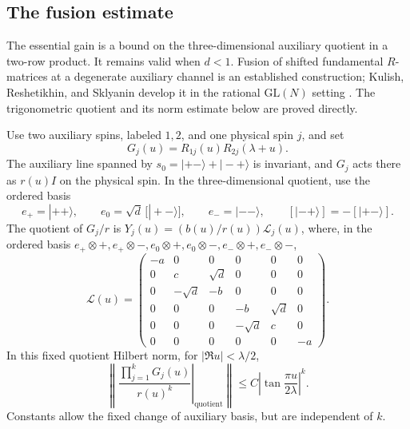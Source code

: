 \subsection{The fusion estimate}

The essential gain is a bound on the three-dimensional auxiliary
quotient in a two-row product.  It remains valid when $d<1$.
Fusion of shifted fundamental $R$-matrices at a degenerate auxiliary
channel is an established construction; Kulish, Reshetikhin, and
Sklyanin develop it in the rational $\mathrm{GL}(N)$ setting
\cite[Section~2, equations~(12)--(18)]{KulishReshetikhinSklyanin1981}.
The trigonometric quotient and its norm estimate below are proved directly.

\begin{lemma}\label{angular:fusion}
Use two auxiliary spins, labeled $1,2$, and one physical spin $j$,
and set
\begin{equation}\label{angular:G}
 G_j(u)=R_{1j}(u)R_{2j}(\lambda+u).
\end{equation}
The auxiliary line spanned by
$s_0=|+-\rangle+|-+\rangle$ is invariant, and $G_j$ acts there
as $r(u)I$ on the physical spin.  In the three-dimensional quotient,
use the ordered basis
\[
 e_+=|++\rangle,\qquad e_0=\sqrt d\,[|+-\rangle],\qquad
 e_-=|--\rangle,
 \qquad [|-+\rangle]=-[|+-\rangle].
\]
The quotient of $G_j/r$ is
$Y_j(u)=(b(u)/r(u))\mathcal L_j(u)$, where, in the ordered basis
$e_+\otimes+,e_+\otimes-,e_0\otimes+,e_0\otimes-,
e_-\otimes+,e_-\otimes-$,
\begin{equation}\label{angular:fused-blocks}
 \mathcal L(u)=
 \begin{pmatrix}
 -a&0&0&0&0&0\\
 0&c&\sqrt d&0&0&0\\
 0&-\sqrt d&-b&0&0&0\\
 0&0&0&-b&\sqrt d&0\\
 0&0&0&-\sqrt d&c&0\\
 0&0&0&0&0&-a
 \end{pmatrix}.
\end{equation}
In this fixed quotient Hilbert norm, for $|\Re u|<\lambda/2$,
\begin{equation}\label{angular:fusion-bound}
 \left\|\left.\frac{\prod_{j=1}^kG_j(u)}{r(u)^k}
                   \right|_{\mathrm{quotient}}\right\|
 \le C\left|\tan\frac{\pi u}{2\lambda}\right|^k.
\end{equation}
Constants allow the fixed change of auxiliary basis, but are
independent of $k$.
\end{lemma}

